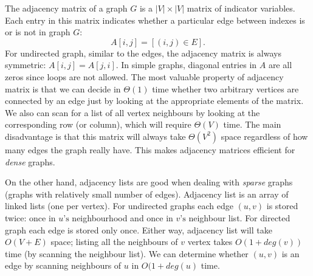     The adjacency matrix of a graph $G$ is a $|V| \times |V|$ matrix of indicator variables. Each entry in this matrix indicates whether a particular edge between indexes is or is not in graph $G$:
    \begin{equation}
      A[i, j] = [(i, j) \in E] \mbox{.}
    \end{equation}
    For undirected graph, similar to the edges, the adjacency matrix is always symmetric: $A[i, j] = A[j, i]$. In simple graphs, diagonal entries in $A$ are all zeros since loops are not allowed. The most valuable property of adjacency matrix is that we can decide in $\Theta(1)$ time whether two arbitrary vertices are connected by an edge just by looking at the appropriate elements of the matrix. We also can scan for a list of all vertex neighbours by looking at the corresponding row (or column), which will require $\Theta(V)$ time. The main disadvantage is that this matrix will always take $\Theta(V^2)$ space regardless of how many edges the graph really have. This makes adjacency matrices efficient for \emph{dense} graphs.

    On the other hand, adjacency lists are good when dealing with \emph{sparse} graphs (graphs with relatively small number of edges). Adjacency list is an array of linked lists (one per vertex). For undirected graphs each edge $(u, v)$ is stored twice: once in $u\mbox{'s}$ neighbourhood and once in $v\mbox{'s}$ neighbour list. For directed graph each edge is stored only once. Either way, adjacency list will take $O(V+E)$ space; listing all the neighbours of $v$ vertex takes $O(1+deg(v))$ time (by scanning the neighbour list). We can determine whether $(u, v)$ is an edge by scanning neighbours of $u$ in $O(1+deg(u)$ time.

